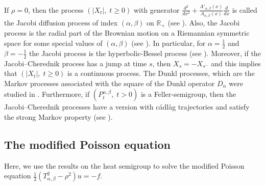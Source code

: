 \documentclass[a4paper,11pt, reqno]{amsart}
\theoremstyle{plain}
\theoremstyle{definition}
\theoremstyle{remark}
\begin{document}
If $\rho=0$, then the process $ \left(|X_t|, \;t \geq 0\right)$ with generator $\frac{d^2}{dx^2} + \frac{A'_{\alpha, \beta} (x)}{A_{\alpha, \beta} (x)} \frac{d}{dx}$ is called the Jacobi diffusion process of index $(\alpha, \beta)$ on $\mathbb{R}_{+}$ (see \cite{gru97, gru98}). Also, the Jacobi process is the radial part of the Brownian motion on a Riemannian symmetric space for some special values of $(\alpha, \beta)$ (see \cite{gru98}). In particular, for $\alpha =\frac{1}{2}$ and $\beta=-\frac{1}{2}$ the Jacobi process is the hyperbolic-Bessel process (see \cite{gru97, yor99}). Moreover, if the Jacobi--Cherednik process has a jump at time $s$, then $X_s=-X_{s^-}$ and this implies that $\left(|X_t|, \;t \geq 0\right)$ is a continuous process. The Dunkl processes, which are the Markov processes associated with the square of the Dunkl operator $D_\alpha$ were studied in \cite{yor06}. Furthermore, if $\left(P^{\alpha, \beta}_t, \;t > 0\right)$ is a Feller-semigroup, then the Jacobi--Cherednik processes have a version with c\'adl\`ag trajectories and satisfy the strong Markov property (see \cite{yor99}).
 
\subsection{The modified Poisson equation}

Here, we use the results on the heat semigroup to solve the modified Poisson equation $\frac{1}{2}\left(T^2_{\alpha, \beta} - \rho^2 \right) u=-f$. 
 
\end{document}
